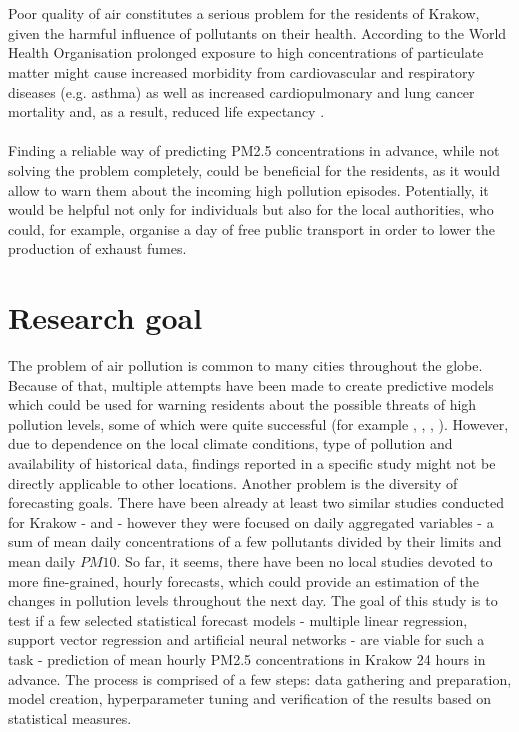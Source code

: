 \\\\
Poor quality of air constitutes a serious problem for the residents of Krakow, given the harmful influence of pollutants on their health. According to the World Health Organisation prolonged exposure to high concentrations of particulate matter might cause increased morbidity from cardiovascular and respiratory diseases (e.g. asthma) as well as increased cardiopulmonary and lung cancer mortality and, as a result, reduced life expectancy \cite{WHO2013PMHEALTH}.
\\\\
Finding a reliable way of predicting PM2.5 concentrations in advance, while not solving the problem completely, could be beneficial for the residents, as it would allow to warn them about the incoming high pollution episodes. Potentially, it would be helpful not only for individuals but also for the local authorities, who could, for example, organise a day of free public transport in order to lower the production of exhaust fumes.

\section{Research goal} \label{sec:introduction-research-goal}
The problem of air pollution is common to many cities throughout the globe. Because of that, multiple attempts have been made to create predictive models which could be used for warning residents about the possible threats of high pollution levels, some of which were quite successful (for example \cite{VLACHOGIANNI20111559}, \cite{Chellali2016}, \cite{LI2017997}, \cite{SIWEK2016}). However, due to dependence on the local climate conditions, type of pollution and availability of historical data, findings reported in a specific study might not be directly applicable to other locations. Another problem is the diversity of forecasting goals. There have been already at least two similar studies conducted for Krakow -  \cite{LOZOWICKA2005} and \cite{Pawul2016} - however they were focused on daily aggregated variables - a sum of mean daily concentrations of a few pollutants divided by their limits and mean daily $PM10$. So far, it seems, there have been no local studies devoted to more fine-grained, hourly forecasts, which could provide an estimation of the changes in pollution levels throughout the next day. The goal of this study is to test if a few selected statistical forecast models - multiple linear regression, support vector regression and artificial neural networks - are viable for such a task - prediction of mean hourly PM2.5 concentrations in Krakow 24 hours in advance. The process is comprised of a few steps: data gathering and preparation, model creation, hyperparameter tuning and verification of the results based on statistical measures.

